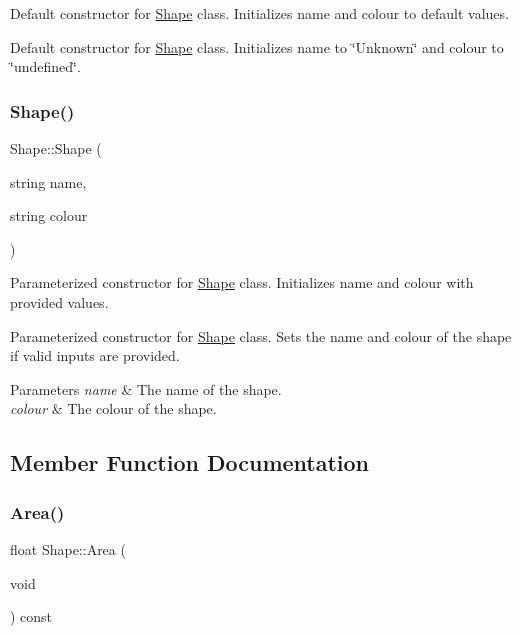 Default constructor for \mbox{\hyperlink{class_shape}{Shape}} class. Initializes name and colour to default values. 

Default constructor for \mbox{\hyperlink{class_shape}{Shape}} class. Initializes name to \char`\"{}\+Unknown\char`\"{} and colour to \char`\"{}undefined\char`\"{}. \mbox{\label{class_shape_ad735b927c63c190803e2b9af27e4c25d}} 
\subsubsection{\texorpdfstring{Shape()}{Shape()}\hspace{0.1cm}{\footnotesize\ttfamily [2/2]}}
{\footnotesize\ttfamily Shape\+::\+Shape (\begin{DoxyParamCaption}\item[{string}]{name,  }\item[{string}]{colour }\end{DoxyParamCaption})}



Parameterized constructor for \mbox{\hyperlink{class_shape}{Shape}} class. Initializes name and colour with provided values. 

Parameterized constructor for \mbox{\hyperlink{class_shape}{Shape}} class. Sets the name and colour of the shape if valid inputs are provided.


\begin{DoxyParams}{Parameters}
{\em name} & The name of the shape. \\
\hline
{\em colour} & The colour of the shape. \\
\hline
\end{DoxyParams}


\subsection{Member Function Documentation}
\mbox{\label{class_shape_ad0c742cb695fdb3e575a31bcd4784c26}} 
\subsubsection{\texorpdfstring{Area()}{Area()}}
{\footnotesize\ttfamily float Shape\+::\+Area (\begin{DoxyParamCaption}\item[{void}]{ }\end{DoxyParamCaption}) const\hspace{0.3cm}{\ttfamily [virtual]}}



